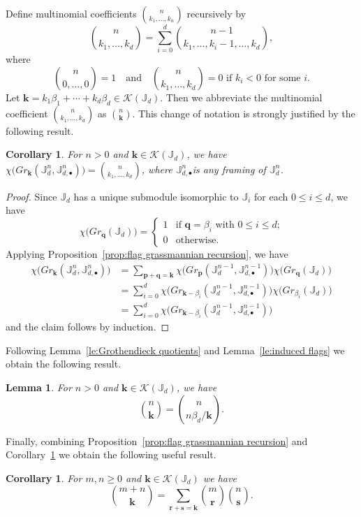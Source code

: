 \documentclass{amsart}
\numberwithin{equation}{section}
\newtheorem{corollary}[theorem]{Corollary}
\newtheorem{lemma}[theorem]{Lemma}
\theoremstyle{definition}
\def\JJ{\mathbb{J}}
\def\bfk{\mathbf{k}}
\def\bfp{\mathbf{p}}
\def\bfq{\mathbf{q}}
\def\bfr{\mathbf{r}}
\def\bfs{\mathbf{s}}
\def\cK{\mathcal{K}}
\begin{document}
Define multinomial coefficients ${n\choose k_1,\ldots,k_n}$ recursively by 
\[{n\choose k_1,\ldots,k_d}=\sum\limits_{i=0}^d {n-1\choose k_1,\ldots,k_i-1,\ldots,k_d},\]
where
\[{n\choose 0,\ldots,0}=1\quad\text{and}\quad{n\choose k_1,\ldots,k_d}=0\text{ if $k_i<0$ for some $i$.}\]
Let $\bfk=k_1\beta_1+\cdots+k_d\beta_d\in\cK(\JJ_d)$.  Then we abbreviate the multinomial coefficient ${n\choose k_1,\ldots,k_d}$ as ${n\choose\bfk}$.  This change of notation is strongly justified by the following result.
\begin{corollary}\label{cor:free Grassmannian Euler characteristics}
  For $n>0$ and $\bfk\in\cK(\JJ_d)$, we have $\chi\big(Gr_\bfk(\JJ_d^n,\JJ_{d,\bullet}^n)\big)={n\choose k_1,\ldots,k_d}$, where $\JJ_{d,\bullet}^n$is any framing of $\JJ_d^n$.
\end{corollary}
\begin{proof}
  Since $\JJ_d$ has a unique submodule isomorphic to $\JJ_i$ for each $0\le i\le d$, we have 
  \[\chi\big(Gr_\bfq(\JJ_d)\big)=\begin{cases}1 & \text{if $\bfq=\beta_i$ with $0\le i\le d$;}\\ 0 & \text{otherwise.}\end{cases}\]
  Applying Proposition~\ref{prop:flag grassmannian recursion}, we have 
  \begin{align*}
    \chi\big(Gr_\bfk(\JJ_d^n,\JJ_{d,\bullet}^n)\big)
    &=\sum\limits_{\bfp+\bfq=\bfk}\chi\big(Gr_\bfp(\JJ_d^{n-1},\JJ_{d,\bullet}^{n-1})\big)\chi\big(Gr_\bfq(\JJ_d)\big)\\
    &=\sum\limits_{i=0}^d\chi\big(Gr_{\bfk-\beta_i}(\JJ_d^{n-1},\JJ_{d,\bullet}^{n-1})\big)\chi\big(Gr_{\beta_i}(\JJ_d)\big)\\
    &=\sum\limits_{i=0}^d\chi\big(Gr_{\bfk-\beta_i}(\JJ_d^{n-1},\JJ_{d,\bullet}^{n-1})\big)
  \end{align*}
  and the claim follows by induction.
\end{proof}
Following Lemma~\ref{le:Grothendieck quotients} and Lemma~\ref{le:induced flags} we obtain the following result.
\begin{lemma}\label{le:multinomial symmetry}
  For $n>0$ and $\bfk\in\cK(\JJ_d)$, we have
  \[{n\choose\bfk}={n\choose n\beta_d/\bfk}.\]
\end{lemma}
Finally, combining Proposition~\ref{prop:flag grassmannian recursion} and Corollary~\ref{cor:free Grassmannian Euler characteristics} we obtain the following useful result.
\begin{corollary}\label{cor:multinomial recursions}
  For $m,n\ge0$ and $\bfk\in\cK(\JJ_d)$ we have
  \[{m+n\choose\bfk}=\sum\limits_{\bfr+\bfs=\bfk}{m\choose\bfr}{n\choose\bfs}.\]
\end{corollary}
\end{document}
